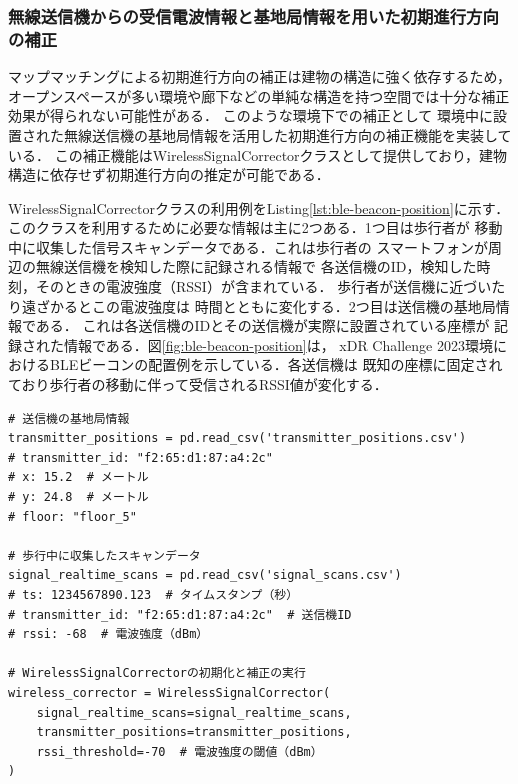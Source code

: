 
\subsubsection{無線送信機からの受信電波情報と基地局情報を用いた初期進行方向の補正}

マップマッチングによる初期進行方向の補正は建物の構造に強く依存するため，
オープンスペースが多い環境や廊下などの単純な構造を持つ空間では十分な補正効果が得られない可能性がある．
このような環境下での補正として
環境中に設置された無線送信機の基地局情報を活用した初期進行方向の補正機能を実装している．
この補正機能はWirelessSignalCorrectorクラスとして提供しており，建物構造に依存せず初期進行方向の推定が可能である．

WirelessSignalCorrectorクラスの利用例をListing\ref{lst:ble-beacon-position}に示す．
このクラスを利用するために必要な情報は主に2つある．1つ目は歩行者が
移動中に収集した信号スキャンデータである．これは歩行者の
スマートフォンが周辺の無線送信機を検知した際に記録される情報で
各送信機のID，検知した時刻，そのときの電波強度（RSSI）が含まれている．
歩行者が送信機に近づいたり遠ざかるとこの電波強度は
時間とともに変化する．2つ目は送信機の基地局情報である．
これは各送信機のIDとその送信機が実際に設置されている座標が
記録された情報である．図\ref{fig:ble-beacon-position}は，
xDR Challenge 2023環境におけるBLEビーコンの配置例を示している．各送信機は
既知の座標に固定されており歩行者の移動に伴って受信されるRSSI値が変化する．

\begin{lstlisting}[caption={WirelessSignalCorrectorの使用例},label=lst:ble-beacon-position,float=h]
# 送信機の基地局情報
transmitter_positions = pd.read_csv('transmitter_positions.csv')
# transmitter_id: "f2:65:d1:87:a4:2c"
# x: 15.2  # メートル
# y: 24.8  # メートル
# floor: "floor_5"

# 歩行中に収集したスキャンデータ
signal_realtime_scans = pd.read_csv('signal_scans.csv')
# ts: 1234567890.123  # タイムスタンプ（秒）
# transmitter_id: "f2:65:d1:87:a4:2c"  # 送信機ID
# rssi: -68  # 電波強度（dBm）

# WirelessSignalCorrectorの初期化と補正の実行
wireless_corrector = WirelessSignalCorrector(
    signal_realtime_scans=signal_realtime_scans,
    transmitter_positions=transmitter_positions,
    rssi_threshold=-70  # 電波強度の閾値（dBm）
)
\end{lstlisting}

